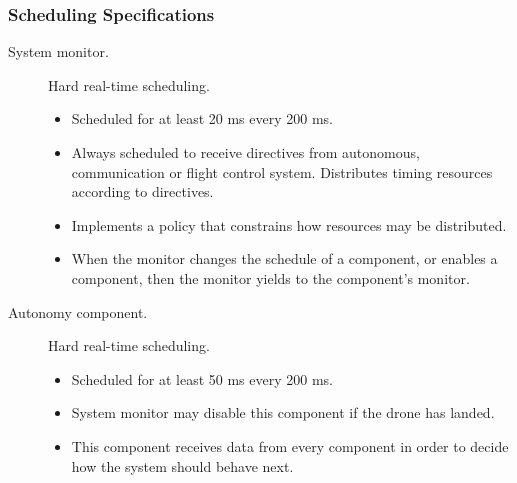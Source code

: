 \subsubsection{Scheduling Specifications}
\begin{description}
	\item[System monitor.] Hard real-time scheduling.
		\begin{itemize}
			\item Scheduled for at least 20 ms every 200 ms.
			\item Always scheduled to receive directives from autonomous, communication or flight control system. Distributes timing resources according to directives.
			\item Implements a policy that constrains how resources may be distributed.
			\item When the monitor changes the schedule of a component, or enables a component, then the monitor yields to the component's monitor.
		\end{itemize}
	\item[Autonomy component.] Hard real-time scheduling.
		\begin{itemize}
			\item Scheduled for at least 50 ms every 200 ms.
			\item System monitor may disable this component if the drone has landed.
			\item This component receives data from every component in order to decide how the system should behave next. 


\end{itemize}
\end{description}
